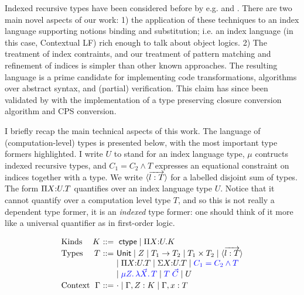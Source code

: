 \documentclass{article}
\begin{document}
Indexed recursive types have been considered before
by e.g. \cite{Zenger:TCS97} and \cite{Xi99popl}. There are two main
novel aspects of our work:
1) the application of these techniques to an index language
supporting notions binding and substitution; i.e. an index language
(in this case, Contextual LF) rich enough to talk about object
logics. 2) The treatment of index contraints, and our treatment of
pattern matching and refinement of indices is simpler than other
known approaches. The resulting language is a prime candidate for
implementing code transformations, algorithms over abstract syntax,
and (partial) verification. This claim has since been validated by
\cite{Belanger13} with the implementation of a type preserving closure
conversion algorithm and CPS conversion.

I briefly recap the main technical aspects of this work. The
language of (computation-level) types is presented below, with the
most important type formers highlighted. I write $U$ to stand for an index
language type, $\mu$ contructs indexed recursive types, and $C_1 = C_2
\wedge T$ expresses an equational constraint on indices together with
a type. We write $\langle \overrightarrow{l : T} \rangle$ for a labelled disjoint sum of
types. The form $\Pi X{:}U. T$ quantifies over an index language type
$U$. Notice that it cannot quantify over a computation level type $T$,
and so this is not really a dependent type former, it is an
\emph{indexed} type former: one should think of it more like a
universal quantifier as in first-order logic.

\[
\begin{array}{l@{~}r@{~}c@{~}l}
%
\mbox{Kinds} & K & \bnfas & \ctype \bnfalt \pibox X U K \\

\mbox{Types} & T  & \bnfas & 
        \m{Unit} 
\bnfalt Z 
\bnfalt T_1 \arrow T_2   
\bnfalt  T_1 \times T_2 
\bnfalt \dsum{\wvec{l : T}} 
\\
& & &   
\bnfalt \pibox X U T 
\bnfalt \sigmabox X U T 
\bnfalt {\color{blue} C_1 = C_2 \andalso T}
\\
&&&    
 \bnfalt {\color{blue} \mu Z.\,\mlam {\vec X}  T}
 \bnfalt {\color{blue} T\;{\vec C} }
\bnfalt U
\\[2pt] %
\mbox{Context} & \Gamma & \bnfas & \cdot \bnfalt \Gamma, Z:K \bnfalt \Gamma, x:T
\end{array}
\]
\end{document}
